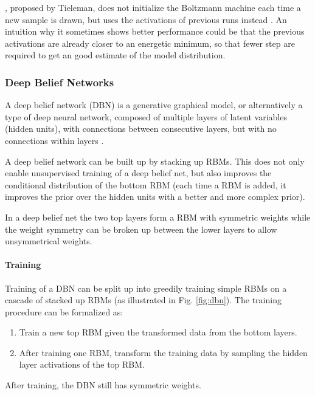 , proposed by Tieleman, does not initialize the Boltzmann machine each time a new sample is drawn, but uses the activations of previous runs instead \cite{tieleman2008training}. An intuition why it sometimes shows better performance could be that the previous activations are already closer to an energetic minimum, so that fewer step are required to get an good estimate of the model distribution. 


\subsubsection{Deep Belief Networks} \label{c:dbns}

A deep belief network (DBN) is a generative graphical model, or alternatively a type of deep neural network, composed of multiple layers of latent variables (hidden units), with connections between consecutive layers, but with no connections within layers \cite{hinton2006fast} \cite{hinton2009deep} \cite{Goodfellow-et-al-2016-Book}.

A deep belief network can be built up by stacking up RBMs.
This does not only enable unsupervised training of a deep belief net, but also improves the conditional distribution of the bottom RBM (each time a RBM is added, it improves the prior over the hidden units with a better and more complex prior).

In a deep belief net the two top layers form a RBM with symmetric weights while the weight symmetry can be broken up between the lower layers to allow unsymmetrical weights.   

\paragraph{Training} \label{c:dbntraining}

Training of a DBN can be split up into greedily training simple RBMs on a cascade of stacked up RBMs (as illustrated in Fig. \ref{fig:dbn}).
The training procedure can be formalized as:  
\begin{enumerate}
\item Train a new top RBM given the transformed data from the bottom layers.
\item After training one RBM, transform the training data by sampling the hidden layer activations of the top RBM.
\end{enumerate}

After training, the DBN still has symmetric weights. 

